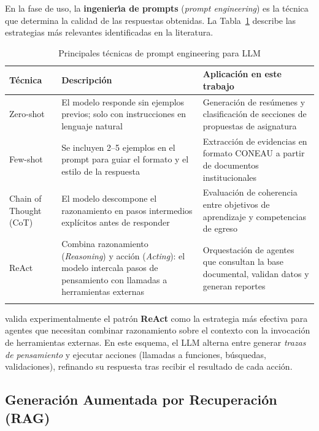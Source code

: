 En la fase de uso, la \textbf{ingenier\'{\i}a de prompts} (\textit{prompt engineering}) es la t\'{e}cnica que determina la calidad de las respuestas obtenidas. La Tabla~\ref{tab:llm_prompting} describe las estrategias m\'{a}s relevantes identificadas en la literatura.

\begin{table}[htb]
\centering
\small
\setlength{\extrarowheight}{4pt}
\caption{Principales técnicas de prompt engineering para LLM}
\label{tab:llm_prompting}
\begin{tabularx}{\textwidth}{p{2.4cm}XX}
\toprule
\textbf{Técnica} & \textbf{Descripción} & \textbf{Aplicación en este trabajo} \\
\midrule
Zero-shot         & El modelo responde sin ejemplos previos; solo con instrucciones en lenguaje natural                                & Generación de resúmenes y clasificación de secciones de propuestas de asignatura \\
\arrayrulecolor{gray!35}\hline
Few-shot          & Se incluyen 2--5 ejemplos en el prompt para guiar el formato y el estilo de la respuesta                          & Extracción de evidencias en formato CONEAU a partir de documentos institucionales \\
\hline
Chain of Thought (CoT) & El modelo descompone el razonamiento en pasos intermedios explícitos antes de responder                     & Evaluación de coherencia entre objetivos de aprendizaje y competencias de egreso \\
\hline
ReAct             & Combina razonamiento (\textit{Reasoning}) y acción (\textit{Acting}): el modelo intercala pasos de pensamiento con llamadas a herramientas externas & Orquestación de agentes que consultan la base documental, validan datos y generan reportes \\
\arrayrulecolor{black}\bottomrule
\end{tabularx}
\end{table}

\citet{garcia2025desarrollo} valida experimentalmente el patrón \textbf{ReAct} como la estrategia más efectiva para agentes que necesitan combinar razonamiento sobre el contexto con la invocación de herramientas externas. En este esquema, el LLM alterna entre generar \textit{trazas de pensamiento} y ejecutar acciones (llamadas a funciones, búsquedas, validaciones), refinando su respuesta tras recibir el resultado de cada acción.

\subsection{Generación Aumentada por Recuperación (RAG)}

